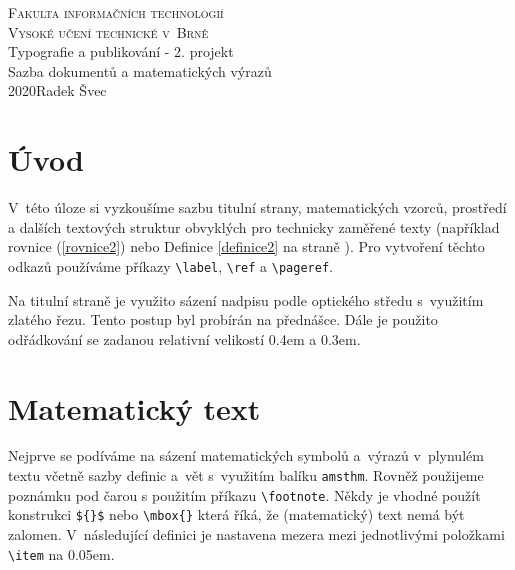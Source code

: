 \documentclass[czech,a4paper,11pt,twocolumn]{article}
\theoremstyle{definition}
\theoremstyle{definition}
\theoremstyle{definition}
\begin{document}
\begin{titlepage}
\begin{center}
\Huge
\textsc{Fakulta informačních technologií}
\\
\textsc{Vysoké učení technické v~Brně\\}
\vfill
\LARGE
Typografie a publikování - 2. projekt
\\
\LARGE
Sazba dokumentů a matematických výrazů\\
\vfill
\Large{2020}\hfill Radek Švec
\end{center}
\end{titlepage}

\section*{Úvod} 
V~této úloze si vyzkoušíme sazbu titulní strany, matematických vzorců, prostředí a dalších textových struktur obvyklých pro technicky zaměřené texty (například rovnice (\ref{rovnice2}) nebo Definice \ref{definice2} na straně \pageref{definice2}). Pro vytvoření těchto odkazů používáme příkazy \verb|\label|, \verb|\ref| a \verb|\pageref|.

Na titulní straně je využito sázení nadpisu podle optického středu s~využitím zlatého řezu. Tento postup byl probírán na přednášce. Dále je použito odřádkování se zadanou relativní velikostí 0.4em a 0.3em.

\section{Matematický text}
Nejprve se podíváme na sázení matematických symbolů a~výrazů v~plynulém textu včetně sazby definic a~vět s~využitím balíku \texttt{amsthm}. Rovněž použijeme poznámku pod čarou s použitím příkazu \verb|\footnote|. Někdy je vhodné použít konstrukci \verb|${}$| nebo \verb|\mbox{}| která říká, že (matematický) text nemá být zalomen. V~následující definici je nastavena mezera mezi jednotlivými položkami \verb|\item| na 0.05em.
\end{document}
